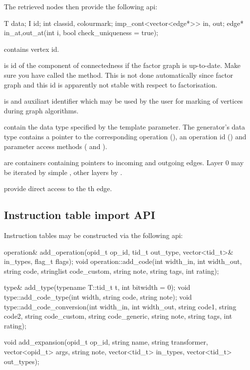 The retrieved nodes then provide the following api:
\begin{code}
T data; I id;
int classid, colourmark; 
imp_cont<vector<edge*>> in, out;
edge* in_at,out_at(int i, bool check_uniqueness = true);
\end{code}

\begin{description}
  \item {} contains vertex id.
  \item {} is id of the component of connectedness if the factor graph is up-to-date. Make sure you have called the  method. This is not done automatically since factor graph and this id is apparently not stable with respect to factorisation.
  \item {} is and auxiliart identifier which may be used by the user for marking of vertices during graph algorithms.
  \item {} contain the data type specified by the  template parameter. The generator's data type contains a pointer to the corresponding operation (), an operation id () and parameter access methods ( and ). 
  \item {} are containers containing pointers to incoming and outgoing edges. Layer 0 may be iterated by simple , other layers by .
  \item {} provide direct access to the th edge.
\end{description}

\subsection{Instruction table import API}

Instruction tables may be constructed via the following api:

\begin{code}
operation& add_operation(opid_t op_id, tid_t out_type, 
  vector<tid_t>& in_types, flag_t flags);
void operation::add_code(int width_in, int width_out, string code, 
  stringlist code_custom, string note, string tags, int rating);

type& add_type(typename T::tid_t t, int bitwidth = 0);
void type::add_code_type(int width, string code, string note);
void type::add_code_conversion(int width_in, int width_out, 
  string code1, string code2, string code_custom, 
  string code_generic, string note, string tags, int rating);

void add_expansion(opid_t op_id, string name, string transformer, 
  vector<opid_t> args, string note, vector<tid_t> in_types, 
  vector<tid_t> out_types);
\end{code}


